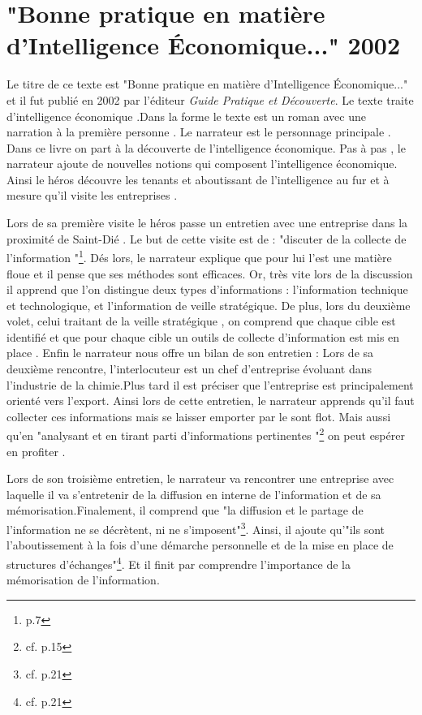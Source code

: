  \part{"Bonne pratique en matière d'Intelligence Économique..." 2002}
 
	 
 
 
 Le titre de ce texte est "Bonne pratique en matière d'Intelligence Économique..." et il fut publié en 2002 par l'éditeur \emph{Guide Pratique et Découverte}.
 Le texte traite d'intelligence économique .Dans la forme le texte est un roman avec une narration à la première personne . Le narrateur est le personnage principale . Dans ce livre on part à la découverte de l'intelligence économique. Pas à pas , le narrateur ajoute de nouvelles notions qui composent l'intelligence économique. Ainsi le héros découvre les tenants et aboutissant de l'intelligence au fur et à mesure qu'il visite les entreprises .

Lors de sa première visite le héros passe un entretien avec une entreprise dans la proximité de Saint-Dié . Le but de cette visite est de : "discuter de la collecte de l'information "\footnote{p.7}. Dés lors, le narrateur explique que pour lui l'\ie est une matière floue et il pense que ses méthodes sont efficaces. Or, très vite lors de la discussion il apprend que l'on distingue deux types d'informations : l'information technique et technologique, et l'information de veille stratégique. De plus, lors du deuxième volet, celui traitant de la veille stratégique , on comprend que chaque cible est identifié et que pour chaque cible un outils de collecte d'information est mis en place . Enfin le narrateur nous offre un bilan de son entretien :
Lors de sa deuxième rencontre, l'interlocuteur est un chef d'entreprise évoluant dans l'industrie de la chimie.Plus tard il est préciser que l'entreprise est principalement orienté vers l'export. Ainsi lors de cette entretien, le narrateur apprends qu'il faut collecter ces informations mais se laisser emporter par le sont flot. Mais aussi qu'en "analysant et en tirant parti d'informations pertinentes "\footnote{cf. p.15} on peut espérer en profiter .

Lors de son troisième entretien, le narrateur va rencontrer une entreprise avec laquelle il va s'entretenir de la diffusion en interne de l'information et de sa mémorisation.Finalement, il comprend que "la diffusion et le partage de l'information ne se décrètent, ni ne s'imposent"\footnote{cf. p.21}. Ainsi, il ajoute qu'"ils sont l'aboutissement à la fois d'une démarche personnelle et de la mise en place de structures d'échanges"\footnote{cf. p.21}. Et il finit par comprendre l'importance de la mémorisation de l'information.

